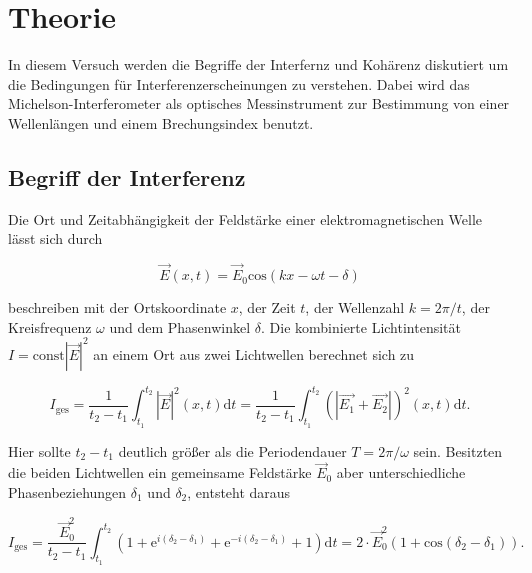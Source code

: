 \section{Theorie}

    \noindent In diesem Versuch werden die Begriffe der Interfernz und Kohärenz diskutiert um die Bedingungen für 
    Interferenzerscheinungen zu verstehen. Dabei wird das Michelson-Interferometer als optisches Messinstrument zur Bestimmung von einer
    Wellenlängen und einem Brechungsindex benutzt.

    \subsection{Begriff der Interferenz}

        \noindent Die Ort und Zeitabhängigkeit der Feldstärke einer elektromagnetischen Welle lässt sich durch 

        \begin{equation}
            \vec{E}(x,t) = \vec{E}_0 \text{cos}(kx - \omega t - \delta) \nonumber
        \end{equation}

        \noindent beschreiben mit der Ortskoordinate $x$, der Zeit $t$, der Wellenzahl $k = 2\pi/t$, der Kreisfrequenz $\omega$ und dem 
        Phasenwinkel $\delta$. Die kombinierte Lichtintensität $I = \text{const} |\vec{E}|^2$ an einem Ort aus zwei Lichtwellen berechnet sich 
        zu 

        \begin{equation}
            I_{\text{ges}} = \frac{1}{t_2 -t_1} \int_{t_1}^{t_2} |\vec{E}|^2(x,t) \text{d} t = 
            \frac{1}{t_2 -t_1} \int_{t_1}^{t_2} \left( |\vec{E_1} + \vec{E_2}| \right) ^2(x,t) \text{d} t  . \nonumber
        \end{equation}

        \noindent Hier sollte $t_2 - t_1$ deutlich größer als die Periodendauer $T=2\pi/\omega$ sein.
        Besitzten die beiden Lichtwellen ein gemeinsame Feldstärke $\vec{E}_0$ aber unterschiedliche Phasenbeziehungen $\delta_1$ und $\delta_2$,
        entsteht daraus 

        \begin{equation}
            I_{\text{ges}} = \frac{\vec{E}_0^2}{t_2 - t_1} \int_{t_1}^{t_2} \left( 1 + \text{e}^{i(\delta_2 -\delta_1)} +\text{e}^{-i(\delta_2 -\delta_1)}
            +1 \right) \text{d} t = 2 \cdot \vec{E}_0^2 ( 1+ \text{cos}(\delta_2 - \delta_1)) . \nonumber
        \end{equation}

